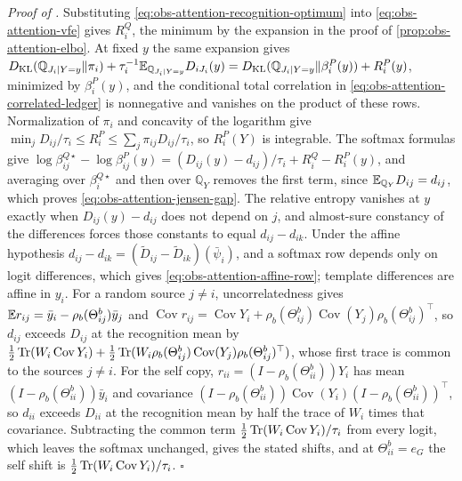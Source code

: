 \noindent\emph{Proof of .}
Substituting \eqref{eq:obs-attention-recognition-optimum} into
\eqref{eq:obs-attention-vfe} gives \(R_i^Q\), the minimum by the expansion in
the proof of \cref{prop:obs-attention-elbo}. At fixed \(y\) the same expansion
gives
\(D_{\mathrm{KL}}(\mathbb Q_{J_i\mid Y=y}\Vert\pi_i)+\tau_i^{-1}\mathbb E_{\mathbb Q_{J_i\mid Y=y}}D_{iJ_i}(y)
=D_{\mathrm{KL}}(\mathbb Q_{J_i\mid Y=y}\Vert\beta_i^P(y))+R_i^P(y)\), minimized by
\(\beta_i^P(y)\), and the conditional total correlation in
\eqref{eq:obs-attention-correlated-ledger} is nonnegative and vanishes on the
product of these rows. Normalization of \(\pi_i\) and concavity of the
logarithm give \(\min_jD_{ij}/\tau_i\leq R_i^P\leq\sum_j\pi_{ij}D_{ij}/\tau_i\),
so \(R_i^P(Y)\) is integrable. The softmax formulas give
\(\log\beta^{Q\star}_{ij}-\log\beta^P_{ij}(y)
=(D_{ij}(y)-d_{ij})/\tau_i+R_i^Q-R_i^P(y)\), and averaging over
\(\beta_i^{Q\star}\) and then over \(\mathbb Q_Y\) removes the first term,
since \(\mathbb E_{\mathbb Q_Y}D_{ij}=d_{ij}\), which proves
\eqref{eq:obs-attention-jensen-gap}. The relative entropy vanishes at \(y\)
exactly when \(D_{ij}(y)-d_{ij}\) does not depend on \(j\), and almost-sure
constancy of the differences forces those constants to equal
\(d_{ij}-d_{ik}\). Under the affine hypothesis
\(d_{ij}-d_{ik}=(\widetilde D_{ij}-\widetilde D_{ik})(\bar\psi_i)\), and a
softmax row depends only on logit differences, which gives
\eqref{eq:obs-attention-affine-row}; template differences are affine in
\(y_i\). For a random source \(j\ne i\), uncorrelatedness gives
\(\mathbb E r_{ij}=\bar y_i-\rho_b(\Theta^b_{ij})\bar y_j\) and
\(\operatorname{Cov}r_{ij}=\operatorname{Cov}Y_i
+\rho_b(\Theta^b_{ij})\operatorname{Cov}(Y_j)\rho_b(\Theta^b_{ij})^\top\), so
\(d_{ij}\) exceeds \(D_{ij}\) at the recognition mean by
\(\frac12\operatorname{Tr}(W_i\operatorname{Cov}Y_i)+\frac12\operatorname{Tr}(W_i\rho_b(\Theta^b_{ij})
\operatorname{Cov}(Y_j)\rho_b(\Theta^b_{ij})^\top)\), whose first trace is
common to the sources \(j\ne i\). For the self copy,
\(r_{ii}=(I-\rho_b(\Theta^b_{ii}))Y_i\) has mean
\((I-\rho_b(\Theta^b_{ii}))\bar y_i\) and covariance
\((I-\rho_b(\Theta^b_{ii}))\operatorname{Cov}(Y_i)(I-\rho_b(\Theta^b_{ii}))^\top\),
so \(d_{ii}\) exceeds \(D_{ii}\) at the recognition mean by half the trace of
\(W_i\) times that covariance. Subtracting the common term
\(\frac12\operatorname{Tr}(W_i\operatorname{Cov}Y_i)/\tau_i\) from every logit, which leaves
the softmax unchanged, gives the stated shifts, and at
\(\Theta^b_{ii}=e_G\) the self shift is
\(\frac12\operatorname{Tr}(W_i\operatorname{Cov}Y_i)/\tau_i\). \(\square\)

